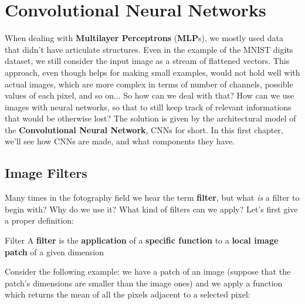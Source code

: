 \chapter{Convolutional Neural Networks}

When dealing with \textbf{Multilayer Perceptrons} (\textbf{MLP}s), we mostly used data that didn't have articulate structures. Even in the example of the MNIST digits dataset, we still consider the input image as a stream of flattened vectors. This approach, even though helps for making small examples, would not hold well with actual images, which are more complex in terms of number of channels, possible values of each pixel, and so on...
\nl
So how can we deal with that? How can we use images with neural networks, so that to still keep track of relevant informations that would be otherwise lost? The solution is given by the architectural model of the \textbf{Convolutional Neural Network}, CNNs for short. In this first chapter, we'll see how CNNs are made, and what components they have.

\section{Image Filters}

Many times in the fotography field we hear the term \textbf{filter}, but what \textit{is} a filter to begin with? Why do we use it? What kind of filters can we apply? Let's first give a proper definition:

\begin{definition}{Filter}
    A \textbf{filter} is the \textbf{application} of a \textbf{specific function} to a \textbf{local image patch} of a given dimension
\end{definition}

Consider the following example: we have a patch of an image (suppose that the patch's dimensions are smaller than the image ones) and we apply a function which returns the mean of all the pixels adjacent to a selected pixel:

